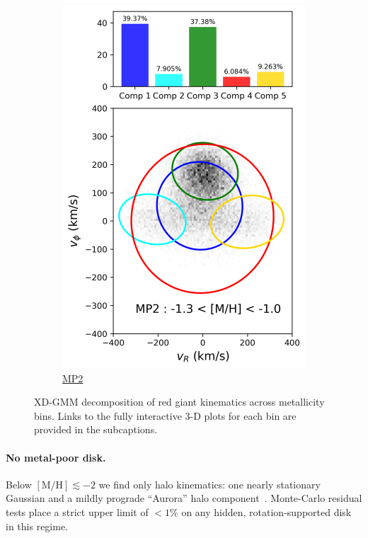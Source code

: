 \documentclass[a4paper,10pt]{article}
\begin{document}
\begin{multicols}{2}
\begin{figure}[H]
\begin{subfigure}[t]{0.24\linewidth}
    \includegraphics[width=\linewidth]{../figures/gmm_MP2.png}
    \caption{\href{https://raw.githack.com/raunaq-rai/Disentangling-the-Milky-Way-using-GMM/main/figures/MP2\_\_-1.3\%5BM\_H\%5D-1.0.html}{MP2}}
    \label{fig:gmm_mp2}
  \end{subfigure}

  \caption{XD-GMM decomposition of red giant kinematics across metallicity bins. Links to the fully interactive 3-D plots for each bin are provided in the subcaptions.}
  \label{fig:gmm_zhang}
\end{figure}

\paragraph{No metal-poor disk.}
Below $\mathrm{[M/H]}\lesssim-2$ we find only halo kinematics: one
nearly stationary Gaussian and a mildly prograde “Aurora” halo
component~\cite{Belokurov2022}.  Monte-Carlo residual tests place a strict
upper limit of $<1\%$ on any hidden, rotation-supported disk in this regime.


\end{multicols}
\end{document}
